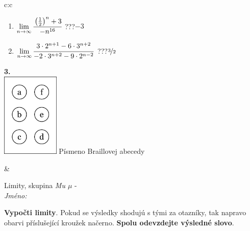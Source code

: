 \documentclass[10pt]{report}
\begin{document}
\begin{tabular}{c:c}
\begin{minipage}[c][104.5mm][t]{0.5\linewidth}
\begin{center}
\begin{minipage}{0.79\linewidth}
\begin{center}
\begin{varwidth}{\linewidth}
\begin{enumerate}
\item $\lim\limits_{n\to\infty}\cfrac{\left(\frac{1}{2}\right)^n +3}{-n^{16}}$\quad \dotfill\; ???\;\dotfill \quad $-3$
\item $\lim\limits_{n\to\infty}\cfrac{3\cdot 2^{n+1}-6\cdot 3^{n+2}}{-2\cdot 3^{n+2}-9\cdot 2^{n-2}}$\quad \dotfill\; ???\;\dotfill \quad $\nicefrac{3}{2}$
\end{enumerate}
\end{varwidth}
\end{center}
\end{minipage}
\begin{minipage}{0.20\linewidth}
\begin{center}
{\Huge\bfseries 3.} \\[2mm]
\includegraphics[height=40mm]{../images/braille.png}
{\small Písmeno Braillovej abecedy}
\end{center}
\end{minipage}
\end{center}
\end{minipage}
&
\begin{minipage}[c][104.5mm][t]{0.5\linewidth}
\begin{center}
\vspace{7mm}
{\huge Limity, skupina \textit{Mu $\mu$} -}\\[5mm]
\textit{Jméno:}\phantom{xxxxxxxxxxxxxxxxxxxxxxxxxxxxxxxxxxxxxxxxxxxxxxxxxxxxxxxxxxxxxxxxx}\\[5mm]
\begin{minipage}{0.95\linewidth}
\begin{center}
\textbf{Vypočti limity}. Pokud se výsledky shodujú s tými za otazníky, tak napravo\\obarvi příslušející kroužek načerno. \textbf{Spolu odevzdejte výsledné slovo}.
\end{center}
\end{minipage}
\\[1mm]
\begin{minipage}{0.79\linewidth}
\begin{center}
\begin{varwidth}{\linewidth}

\end{varwidth}
\end{center}
\end{minipage}
\end{center}
\end{minipage}
\end{tabular}
\end{document}

